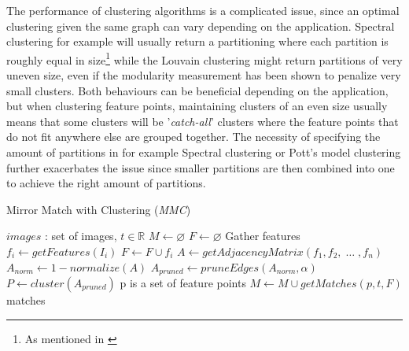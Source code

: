 The performance of clustering algorithms is a complicated issue, since 
an optimal clustering given the same graph can vary depending on the 
application. Spectral clustering for example will usually return a 
partitioning where each partition is roughly equal in size\footnote{As 
mentioned in \cite{von2007}} while the Louvain 
clustering\cite{blondel2008} might return partitions of very uneven 
size, even if the modularity measurement has been shown to penalize very 
small clusters\cite{brandes2007}. Both behaviours can be beneficial 
depending on the application, but when clustering feature points, 
maintaining clusters of an even size usually means that some clusters 
will be '\emph{catch-all}' clusters where the feature points that do 
not fit anywhere else are grouped together. The necessity of specifying 
the amount of partitions in for example Spectral clustering or Pott's 
model clustering further exacerbates the issue since smaller partitions 
are then combined into one to achieve the right amount of partitions.

%
\begin{algorithm}
\caption{Mirror Match with Clustering (\emph{MMC})}
\label{alg-mmc}
\begin{algorithmic}
\Require $images$ : set of images, $t \in \mathbb{R}$
\State $M\gets \varnothing$
\State $F\gets \varnothing$
 \Comment Gather features
	\State $f_i\gets getFeatures(I_i)$
	\State $F\gets F \cup f_i$
\EndFor
\State $A\gets getAdjacencyMatrix(f_1, f_2,\; \ldots \;, f_n)$
\State $A_{norm}\gets 1 - normalize(A)$
\State $A_{pruned}\gets pruneEdges(A_{norm},\alpha)$
\State $P\gets cluster(A_{pruned})$
 \Comment p is a set of feature points
	\State $M\gets M \cup getMatches(p, t, F)$
\EndFor \\
\Return matches
\end{algorithmic}
\end{algorithm}

